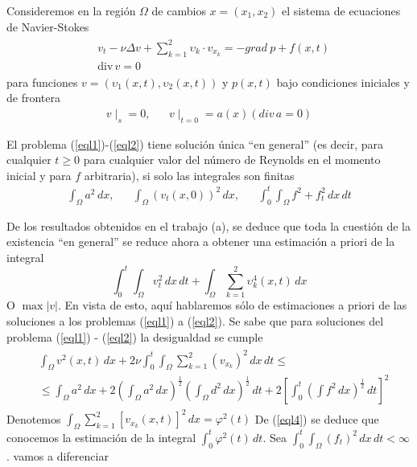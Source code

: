 Consideremos en la región $\Omega$ de cambios $x = (x_1, x_2)$ el sistema de ecuaciones de Navier-Stokes
\begin{align}
    \begin{split}
    &v_t -\nu \Delta v + \sum_{k = 1}^{2} \upsilon_k \cdot v_{x_k} = - grad\: p + f(x,t)\\
    &\text{div}\, v = 0
    \label{eql1}
    \end{split}
\end{align}
para funciones $v = \left(\upsilon_1(x, t), \upsilon_2(x, t)  \right)$ y $p(x, t)$ bajo condiciones iniciales y de frontera
\begin{align}
    v\mid_s = 0,&&v\mid_{t = 0} = a(x)\left(div\, a = 0 \right)
    \label{eql2}
\end{align}
\begin{theorem}
    El problema (\ref{eql1})-(\ref{eql2}) tiene solución única ``en general'' (es decir, para cualquier $t\geq 0$ para cualquier valor del número de Reynolds en el momento inicial y para $f$ arbitraria), si solo las integrales son finitas
    \begin{align*}
        \int_{\Omega} a^2\,dx,&&\int_{\Omega}\left(v_t(x,0)\right)^2\,dx, &&\int_0^t\int_{\Omega} f^2 + f_t^2\,dx\,dt
    \end{align*}
\end{theorem}
De los resultados obtenidos en el trabajo (a), se deduce que toda la cuestión de la existencia ``en general'' se reduce ahora a obtener una estimación a priori de la integral
\begin{equation}
    \int_0^t\int_{\Omega} v_t^2\,dx\,dt + \int_{\Omega} \sum_{k = 1}^2 \upsilon_k^4(x,t)\,dx
    \label{eql3}
\end{equation}
O $\max \left\lvert v \right\rvert $. En vista de esto, aquí hablaremos sólo de estimaciones a priori de las soluciones a los problemas (\ref{eql1}) a (\ref{eql2}). Se sabe que para soluciones del problema (\ref{eql1}) - (\ref{eql2}) la desigualdad se cumple
\begin{align}
    \begin{split}
        &\int_{\Omega}v^2(x,t)\,dx + 2\nu \int_0^t\int_{\Omega}\sum_{k =1}^2 \left(v_{x_k}\right)^2\,dx\,dt\leq\\
        &\leq \int_{\Omega}a^2\,dx + 2\left(\int_{\Omega}a^2\,dx\right)^{\frac{1}{2}}\left(\int_{\Omega} d^2\,dx\right)^{\frac{1}{2}}\,dt + 2\left[\int_0^t\left(\int f^2\,dx\right)^{\frac{1}{2}}\,dt\right]^2
        \label{eql4}
    \end{split}
\end{align}
Denotemos $\int_{\Omega}\sum_{k=1}^2\left[v_{x_k}(x,t)\right]^2\,dx=\varphi^2(t)$ De (\ref{eql4}) se deduce que conocemos la estimación de la integral $\int_0^t \varphi^2(t)\,dt $. Sea $\int_0^t\int_{\Omega} \left(f_t\right)^2\,dx\,dt<\infty$. vamos a diferenciar

